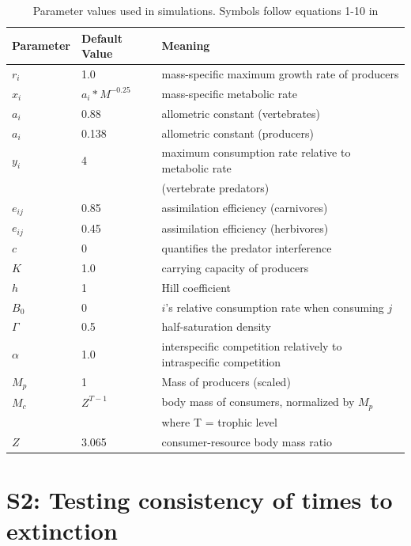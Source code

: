 \documentclass[12pt]{article}
\begin{document}
\begin{spacing}{2.0}
\begin{table}[h]
\caption{Parameter values used in simulations. Symbols follow equations 1-10 in \citet{Delmas2017}}
\begin{tabular}{lll}
\textbf{Parameter} & \textbf{Default Value} & \textbf{Meaning} \\ \hline
$r_i$ & 1.0 & mass-specific maximum growth rate of producers\\
$x_i$ & $a_i*M^{-0.25}$ & mass-specific metabolic rate\\
$a_i$ & 0.88 & allometric constant (vertebrates)\\
$a_i$ & 0.138 & allometric constant (producers)\\
$y_i$ & 4 & maximum consumption rate relative to metabolic rate \\&&(vertebrate predators)\\
$e_{ij}$ & 0.85 & assimilation efficiency (carnivores) \\
$e_{ij}$ & 0.45 & assimilation efficiency (herbivores) \\

$c$ & 0 & quantifies the predator interference\\

$K$  & 1.0 & carrying capacity of producers\\

$h$ & 1 & Hill coefficient \\
$B_0$ & 0 & $i$'s relative consumption rate when consuming $j$\\

$\Gamma$ & 0.5 & half-saturation density\\
$\alpha$ & 1.0 & interspecific competition relatively to intraspecific competition \\
$M_p$ & 1 & Mass of producers (scaled) \\
$M_c$ & $Z^{T-1}$ & body mass of consumers, normalized by $M_p$ \\&& where T = trophic level\\
$Z$ & 3.065   & consumer-resource body mass ratio \\

\end{tabular}
\end{table}
\clearpage


\section*{S2: Testing consistency of times to extinction}


\end{spacing}
\end{document}
